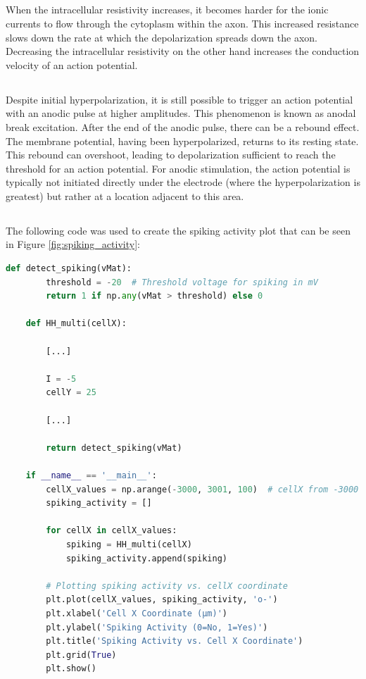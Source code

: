 \documentclass{article}
\begin{document}
    \subsection{}
    When the intracellular resistivity increases, it becomes harder for the ionic currents to flow through the cytoplasm within the axon.
    This increased resistance slows down the rate at which the depolarization spreads down the axon.
    Decreasing the intracellular resistivity on the other hand increases the conduction velocity of an action potential.

    \subsection{}
    Despite initial hyperpolarization, it is still possible to trigger an action potential with an anodic pulse at higher amplitudes.
    This phenomenon is known as anodal break excitation.
    After the end of the anodic pulse, there can be a rebound effect.
    The membrane potential, having been hyperpolarized, returns to its resting state.
    This rebound can overshoot, leading to depolarization sufficient to reach the threshold for an action potential.
    For anodic stimulation, the action potential is typically not initiated directly under the electrode (where the hyperpolarization is greatest) but rather at a location adjacent to this area.

    \subsection{}
    The following code was used to create the spiking activity plot that can be seen in Figure \ref{fig:spiking_activity}:

    \begin{lstlisting}[language=Python, style=mystyle]
    def detect_spiking(vMat):
        threshold = -20  # Threshold voltage for spiking in mV
        return 1 if np.any(vMat > threshold) else 0

    def HH_multi(cellX):

        [...]

        I = -5
        cellY = 25

        [...]

        return detect_spiking(vMat)

    if __name__ == '__main__':
        cellX_values = np.arange(-3000, 3001, 100)  # cellX from -3000 to 3000 in steps of 100 µm
        spiking_activity = []

        for cellX in cellX_values:
            spiking = HH_multi(cellX)
            spiking_activity.append(spiking)

        # Plotting spiking activity vs. cellX coordinate
        plt.plot(cellX_values, spiking_activity, 'o-')
        plt.xlabel('Cell X Coordinate (µm)')
        plt.ylabel('Spiking Activity (0=No, 1=Yes)')
        plt.title('Spiking Activity vs. Cell X Coordinate')
        plt.grid(True)
        plt.show()
    \end{lstlisting}
\end{document}
